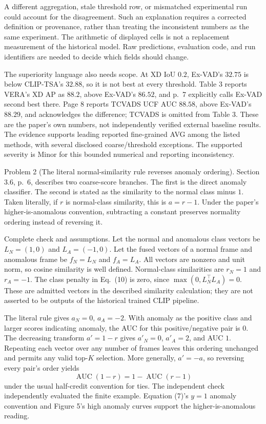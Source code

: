 \documentclass[10pt]{article}
\begin{document}
A different aggregation, stale threshold row, or mismatched experimental run could account for the disagreement. Such an explanation requires a corrected definition or provenance, rather than treating the inconsistent numbers as the same experiment. The arithmetic of displayed cells is not a replacement measurement of the historical model. Raw predictions, evaluation code, and run identifiers are needed to decide which fields should change.\par
The superiority language also needs scope. At XD IoU \(0.2\), Ex-VAD’s \(32.75\) is below CLIP-TSA’s \(32.88\), so it is not best at every threshold. Table 3 reports VERA’s XD AP as \(88.2\), above Ex-VAD’s \(86.52\), and p. 7 explicitly calls Ex-VAD second best there. Page 8 reports TCVADS UCF AUC \(88.58\), above Ex-VAD’s \(88.29\), and acknowledges the difference; TCVADS is omitted from Table 3. These are the paper’s own numbers, not independently verified external baseline results. The evidence supports leading reported fine-grained AVG among the listed methods, with several disclosed coarse/threshold exceptions. The supported severity is Minor for this bounded numerical and reporting inconsistency.\par
Problem 2 (The literal normal-similarity rule reverses anomaly ordering).  Section 3.6, p. 6, describes two coarse-score branches. The first is the direct anomaly classifier. The second is stated as the similarity to the normal class minus \(1\). Taken literally, if \(r\) is normal-class similarity, this is \(a=r-1\). Under the paper’s higher-is-anomalous convention, subtracting a constant preserves normality ordering instead of reversing it.\par
Complete check and assumptions. Let the normal and anomalous class vectors be \(L_N=(1,0)\) and \(L_A=(-1,0)\). Let the fused vectors of a normal frame and anomalous frame be \(f_N=L_N\) and \(f_A=L_A\). All vectors are nonzero and unit norm, so cosine similarity is well defined. Normal-class similarities are \(r_N=1\) and \(r_A=-1\). The class penalty in Eq. (10) is zero, since \(\max(0,L_N^\top L_A)=0\). These are admitted vectors in the described similarity calculation; they are not asserted to be outputs of the historical trained CLIP pipeline.\par
The literal rule gives \(a_N=0\), \(a_A=-2\). With anomaly as the positive class and larger scores indicating anomaly, the AUC for this positive/negative pair is \(0\). The decreasing transform \(a'=1-r\) gives \(a'_N=0\), \(a'_A=2\), and AUC \(1\). Repeating each vector over any number of frames leaves this ordering unchanged and permits any valid top-\(K\) selection. More generally, \(a'=-a\), so reversing every pair’s order yields \[\operatorname{AUC}(1-r)=1-\operatorname{AUC}(r-1)\] under the usual half-credit convention for ties. The independent check independently evaluated the finite example. Equation (7)’s \(y=1\) anomaly convention and Figure 5’s high anomaly curves support the higher-is-anomalous reading.\par
\end{document}
